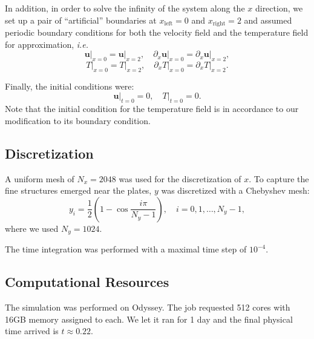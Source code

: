 In addition, in order to solve the infinity of the system along the $x$ direction, we set up a pair of ``artificial'' boundaries at $x_\mathrm{left}=0$ and $x_\mathrm{right}=2$ and assumed periodic boundary conditions for both the velocity field and the temperature field for approximation, \emph{i.e.}
\begin{equation}
    \mathbf{u}\big|_{x=0}=\mathbf{u}\big|_{x=2},\quad \partial_x\mathbf{u}\big|_{x=0}=\partial_x\mathbf{u}\big|_{x=2},
\end{equation}
\begin{equation}
    T\big|_{x=0}=T\big|_{x=2},\quad 
    \partial_x T\big|_{x=0}=\partial_x T\big|_{x=2}.
\end{equation}

Finally, the initial conditions were:
\begin{equation}
    \mathbf{u}\big|_{t=0}=0,\quad T\big|_{t=0}=0.
\end{equation}
Note that the initial condition for the temperature field is in accordance to our modification to its boundary condition. 

\subsection{Discretization}
A uniform mesh of $N_x=2048$ was used for the discretization of $x$. To capture the fine structures emerged near the plates, $y$ was discretized with a Chebyshev mesh:
\begin{equation}
    y_i=\frac{1}{2}\left(1-\cos\frac{i\pi}{N_y-1}\right),\quad i=0,1,\ldots,N_y-1,
\end{equation}
where we used $N_y=1024$. 

The time integration was performed with a maximal time step of $10^{-4}$.

\subsection{Computational Resources}
The simulation was performed on Odyssey. The job requested 512 cores with 16GB memory assigned to each. We let it ran for 1 day and the final physical time arrived is $t\approx 0.22$.